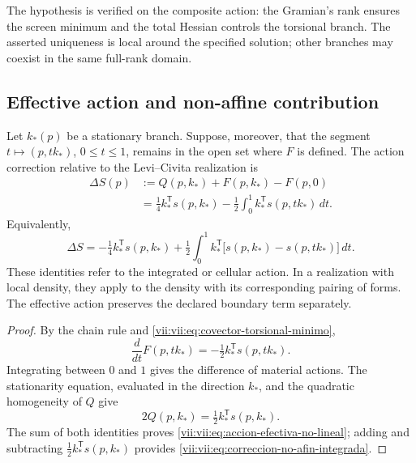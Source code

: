 The hypothesis is verified on the composite action: the Gramian's
rank ensures the screen minimum and the total Hessian controls
the torsional branch. The asserted uniqueness is local around the
specified solution; other branches may coexist in the same
full-rank domain.

\subsection{Effective action and non-affine contribution}
\label{vii:vii:subsec:accion-efectiva-no-afin}

\begin{theorem}
\label{vii:vii:thm:eliminacion-torsional-no-lineal}
Let \(k_*(p)\) be a stationary branch. Suppose, moreover, that the
segment \(t\mapsto (p,tk_*)\), \(0\leq t\leq1\), remains
in the open set where \(F\) is defined. The action correction
relative to the Levi--Civita realization is
\begin{equation}
 \begin{split}
 \Delta S(p)
  &:=Q(p,k_*)+F(p,k_*)-F(p,0)\\
  &=\tfrac14 k_*^{\mathsf T}s(p,k_*)
     -\tfrac12\int_0^1
           k_*^{\mathsf T}s(p,tk_*)\,dt.
 \end{split}
 \label{vii:vii:eq:accion-efectiva-no-lineal}
\end{equation}
Equivalently,
\begin{equation}
 \Delta S=-\tfrac14 k_*^{\mathsf T}s(p,k_*)
  +\tfrac12\int_0^1 k_*^{\mathsf T}
       \bigl[s(p,k_*)-s(p,tk_*)\bigr]\,dt.
 \label{vii:vii:eq:correccion-no-afin-integrada}
\end{equation}
These identities refer to the integrated or cellular action.
In a realization with local density, they apply to the density
with its corresponding pairing of forms. The effective action
preserves the declared boundary term separately.
\end{theorem}

\begin{proof}
By the chain rule and
\eqref{vii:vii:eq:covector-torsional-minimo},
\[
 \frac{d}{dt}F(p,tk_*)
      =-\tfrac12 k_*^{\mathsf T}s(p,tk_*).
\]
Integrating between \(0\) and \(1\) gives the difference of material
actions. The stationarity equation, evaluated in the
direction \(k_*\), and the quadratic homogeneity of \(Q\) give
\[
 2Q(p,k_*)=\tfrac12 k_*^{\mathsf T}s(p,k_*).
\]
The sum of both identities proves
\eqref{vii:vii:eq:accion-efectiva-no-lineal}; adding and subtracting
\(\tfrac12k_*^{\mathsf T}s(p,k_*)\) provides
\eqref{vii:vii:eq:correccion-no-afin-integrada}.
\end{proof}

